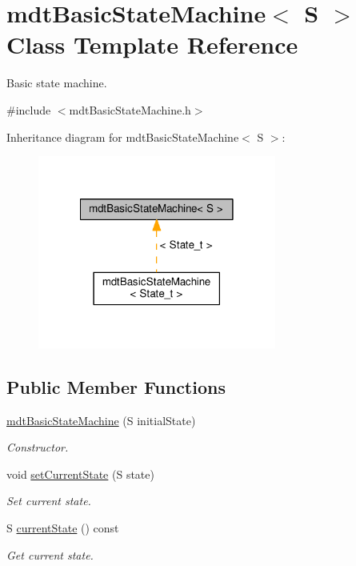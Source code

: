 \hypertarget{classmdt_basic_state_machine}{\section{mdt\-Basic\-State\-Machine$<$ S $>$ Class Template Reference}
\label{classmdt_basic_state_machine}
}


Basic state machine.  




{\ttfamily \#include $<$mdt\-Basic\-State\-Machine.\-h$>$}



Inheritance diagram for mdt\-Basic\-State\-Machine$<$ S $>$\-:
\nopagebreak
\begin{figure}[H]
\begin{center}
\leavevmode
\includegraphics[width=222pt]{classmdt_basic_state_machine__inherit__graph}
\end{center}
\end{figure}
\subsection*{Public Member Functions}
\begin{DoxyCompactItemize}
\item 
\hyperlink{classmdt_basic_state_machine_a6b6261f9f6f602e62fed8481e7d176b9}{mdt\-Basic\-State\-Machine} (S initial\-State)
\begin{DoxyCompactList}\small\item\em Constructor. \end{DoxyCompactList}\item 
void \hyperlink{classmdt_basic_state_machine_ada54fcad4ecd0b03ab5a8d7dd9e4bb88}{set\-Current\-State} (S state)
\begin{DoxyCompactList}\small\item\em Set current state. \end{DoxyCompactList}\item 
S \hyperlink{classmdt_basic_state_machine_a812e5278badf8eb764473122e85a6a3e}{current\-State} () const 
\begin{DoxyCompactList}\small\item\em Get current state. \end{DoxyCompactList}\end{DoxyCompactItemize}


